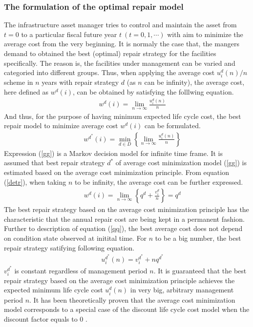 \subsubsection{The formulation of the optimal repair model}
\label{6333}
The infrastructure asset manager tries to control and maintain the asset from $t=0$ to a particular fiscal future year  $t~(t=0,1,\cdots) $ with aim to minimize the average cost from the very beginning. It is normaly the case that, the mangers demand to obtained the best (optimal) repair strategy for the facilities specifically. The reason is, the facilities under management can be varied and categoried into different groups. Thus, when applying the average cost $u_i^d(n)/n$ scheme in $n$  years with repair strategy $d$ (as $n$ can be infinity), the average cost, here defined as $w^d(i) $, can be obtained by satisfying the folllwing equation. 
\begin{eqnarray}
&& w^{d}(i)= \lim_{n \to \infty} \frac{u_{i}^{d}(n)}{n}   \label{mugen}
\end{eqnarray}
And thus, for the purpose of having minimum expected life cycle cost, the best repair model to minimize average cost $w^d(i) $ can be formulated.
\begin{eqnarray}
&& w^{d^*}(i)= \min_{d \in D} \left\{\lim_{n \to \infty} \frac{u_{i}^{d}(n)}{n} \right\} \label{gg}
\end{eqnarray}
Expression (\ref{gg}) is a Markov decision model for infinite time frame. It is assumed that best repair strategy $d^\ast$ of average cost minimization model (\ref{gg}) is estimated based on the average cost minimization principle. From equation (\ref{detr}), when taking $n$ to be infinity, the average cost can be further expressed.
\begin{eqnarray}
&& w^d(i) = \lim_{n\rightarrow \infty} \left\{ q^d + \frac{v_i^d}{n}\right\}= q^d \label{qq}
\end{eqnarray}
The best repair strategy based on the average cost minimization principle has the characteristic that the annual repair cost are being kept in a permanent fashion. Further to description of equation (\ref{qq}), the best average cost does not depend on condition state observed at initital time. For $n$ to be a big number, the best repair strategy satifying following equation.
\begin{eqnarray}
&& u_i^{d^\ast}(n)=v_i^{d^\ast}+nq^{d^\ast}
\end{eqnarray}
$v_i^{d^\ast} $ is constant regardless of management period $n$. It is guaranteed that the best repair strategy based on the average cost minimization principle achieves the expected minimum life cycle cost $u_i^d(n)$ in very big, arbitrary management period $n$. It has been theoretically proven that the average cost minimization model corresponds to a special case of the discount life cycle cost model when the discount factor equals to $0$ \cite{howard}.
